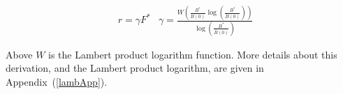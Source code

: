 \documentclass[12pt]{article}
\begin{document}
%
%
%
%

%
\begin{align}
&r = \gamma F^*
&\gamma = \frac{W\left(\frac{B^*}{\bar B(0)}\log\left(\frac{B^*}{\bar B(0)}\right)\right)}{\log\left(\frac{B^*}{\bar B(0)}\right)} \label{gammaOfB}
\end{align}

%
Above $W$ is the Lambert product logarithm function. 
More details about this derivation, and the Lambert product logarithm, are given in \mbox{Appendix (\ref{lambApp}).}


\end{document}
